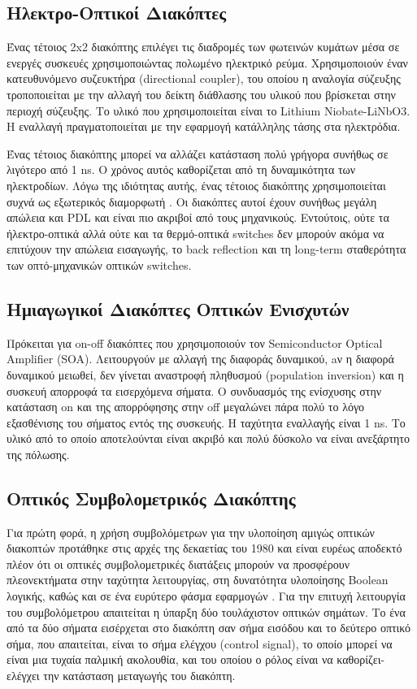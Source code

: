 \subsection{Ηλεκτρο-Οπτικοί Διακόπτες}

Ένας τέτοιος 2x2 διακόπτης επιλέγει τις διαδρομές των φωτεινών κυμάτων
μέσα σε ενεργές συσκευές χρησιμοποιώντας πολωμένο ηλεκτρικό
ρεύμα. Χρησιμοποιούν έναν κατευθυνόμενο συζευκτήρα (directional
coupler), του οποίου η αναλογία σύζευξης τροποποιείται με την αλλαγή
του δείκτη διάθλασης του υλικού που βρίσκεται στην περιοχή
σύζευξης. Το υλικό που χρησιμοποιείται είναι το Lithium
Niobate-LiNbO3. Η εναλλαγή πραγματοποιείται με την εφαρμογή κατάλληλης
τάσης στα ηλεκτρόδια.

Ένας τέτοιος διακόπτης μπορεί να αλλάζει κατάσταση πολύ γρήγορα
συνήθως σε λιγότερο από 1 ns. Ο χρόνος αυτός καθορίζεται από τη
δυναμικότητα των ηλεκτροδίων. Λόγω της ιδιότητας αυτής, ένας τέτοιος
διακόπτης χρησιμοποιείται συχνά ως εξωτερικός διαμορφωτή \cite{conta}. Οι
διακόπτες αυτοί έχουν συνήθως μεγάλη απώλεια και PDL και είναι πιο
ακριβοί από τους μηχανικούς. Εντούτοις, ούτε τα ήλεκτρο-οπτικά αλλά
ούτε και τα θερμό-οπτικά switches δεν μπορούν ακόμα να επιτύχουν την
απώλεια εισαγωγής, το back reflection και τη long-term σταθερότητα των
οπτό-μηχανικών οπτικών switches.

\subsection{Ημιαγωγικοί Διακόπτες Οπτικών Ενισχυτών}

Πρόκειται για on-off διακόπτες που χρησιμοποιούν τον Semiconductor
Optical Amplifier (SOA). Λειτουργούν με αλλαγή της διαφοράς δυναμικού,
aν η διαφορά δυναμικού μειωθεί, δεν γίνεται αναστροφή πληθυσμού
(population inversion) και η συσκευή απορροφά τα εισερχόμενα σήματα. Ο
συνδυασμός της ενίσχυσης στην κατάσταση on και της απορρόφησης στην
off μεγαλώνει πάρα πολύ το λόγο εξασθένισης του σήματος εντός της
συσκευής. Η ταχύτητα εναλλαγής είναι 1 ns. Το υλικό από το οποίο
αποτελούνται είναι ακριβό και πολύ δύσκολο να είναι ανεξάρτητο της
πόλωσης.

\subsection{Οπτικός Συμβολομετρικός Διακόπτης}

Για πρώτη φορά, η χρήση συμβολόμετρων για την υλοποίηση αμιγώς οπτικών
διακοπτών προτάθηκε στις αρχές της δεκαετίας του 1980 \cite{1071766}
και είναι ευρέως αποδεκτό πλέον ότι οι οπτικές συμβολομετρικές
διατάξεις μπορούν να προσφέρουν πλεονεκτήματα στην ταχύτητα
λειτουργίας, στη δυνατότητα υλοποίησης Boolean λογικής, καθώς και σε
ένα ευρύτερο φάσμα εφαρμογών \cite{Patel:98}.  Για την επιτυχή
λειτουργία του συμβολόμετρου απαιτείται η ύπαρξη δύο τουλάχιστον
οπτικών σημάτων. Το ένα από τα δύο σήματα εισέρχεται στο διακόπτη σαν
σήμα εισόδου και το δεύτερο οπτικό σήμα, που απαιτείται, είναι το σήμα
ελέγχου (control signal), το οποίο μπορεί να είναι μια τυχαία παλμική
ακολουθία, και του οποίου ο ρόλος είναι να καθορίζει-ελέγχει την
κατάσταση μεταγωγής του διακόπτη.

